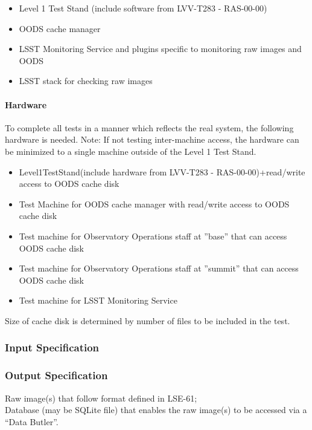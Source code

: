 \begin{itemize}
\tightlist
\item
  Level 1 Test Stand (include software from LVV-T283 - RAS-00-00)
\item
  OODS cache manager
\item
  LSST Monitoring Service and plugins specific to monitoring raw images
  and OODS~
\item
  LSST stack for checking raw images
\end{itemize}


\paragraph{Hardware}
To complete all tests in a manner which reflects the real system, the
following hardware is needed. Note: If not testing inter-machine access,
the hardware can be minimized to a single machine outside of the Level 1
Test Stand.

\begin{itemize}
\tightlist
\item
  Level1TestStand(include hardware from LVV-T283 - RAS-00-00)+read/write
  access to OODS cache disk
\item
  Test Machine for OODS cache manager with read/write access to OODS
  cache disk
\item
  Test machine for Observatory Operations staff at ''base'' that can
  access OODS cache disk
\item
  Test machine for Observatory Operations staff at ''summit'' that can
  access OODS cache disk
\item
  Test machine for LSST Monitoring Service
\end{itemize}

Size of cache disk is determined by number of files to be included in
the test.


\subsubsection{Input Specification}

\subsubsection{Output Specification}
Raw image(s) that follow format defined in LSE-61;\\
Database (may be SQLite file) that enables the raw image(s) to be
accessed via a ``Data Butler''.


